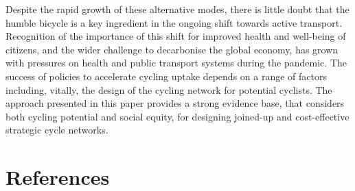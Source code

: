\documentclass[
]{article}
\begin{document}
Despite the rapid growth of these alternative modes, there is little doubt that
the humble bicycle is a key ingredient in the ongoing shift towards active transport.
Recognition of the importance of this shift for improved health and well-being
of citizens, and the wider challenge to decarbonise the global economy,
has grown with pressures on health and public transport systems during the pandemic.
The success of policies to accelerate cycling uptake depends on a range of
factors including, vitally, the design of the
cycling network for potential cyclists.
The approach presented in this paper provides a strong evidence base,
that considers both cycling potential and social equity,
for designing joined-up and cost-effective strategic cycle networks.

\hypertarget{references}{%
\section*{References}\label{references}}

\setlength{\parindent}{-0.5in}
\setlength{\leftskip}{0.5in}
\setlength{\parskip}{8pt}
\end{document}
